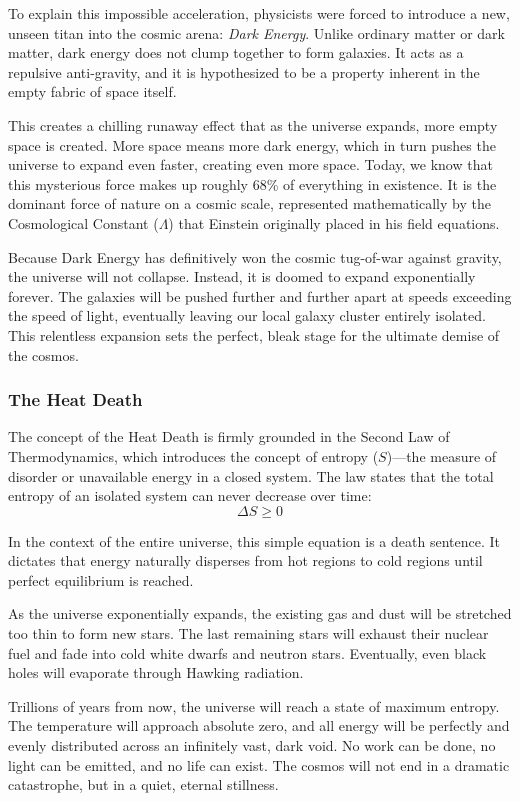 \documentclass[10pt,a4paper]{article}
\begin{document}
To explain this impossible acceleration, physicists were forced to introduce a new, unseen titan into the cosmic arena: \textit{Dark Energy}. Unlike ordinary matter or dark matter, dark energy does not clump together to form galaxies. It acts as a repulsive anti-gravity, and it is hypothesized to be a property inherent in the empty fabric of space itself. 

This creates a chilling runaway effect that as the universe expands, more empty space is created. More space means more dark energy, which in turn pushes the universe to expand even faster, creating even more space. Today, we know that this mysterious force makes up roughly 68\% of everything in existence. It is the dominant force of nature on a cosmic scale, represented mathematically by the Cosmological Constant ($\Lambda$) that Einstein originally placed in his field equations.

Because Dark Energy has definitively won the cosmic tug-of-war against gravity, the universe will not collapse. Instead, it is doomed to expand exponentially forever. The galaxies will be pushed further and further apart at speeds exceeding the speed of light, eventually leaving our local galaxy cluster entirely isolated. This relentless expansion sets the perfect, bleak stage for the ultimate demise of the cosmos.

\subsubsection{The Heat Death}
The concept of the Heat Death is firmly grounded in the Second Law of Thermodynamics, which introduces the concept of entropy ($S$)—the measure of disorder or unavailable energy in a closed system. The law states that the total entropy of an isolated system can never decrease over time:
$$\Delta S \geq 0$$

In the context of the entire universe, this simple equation is a death sentence. It dictates that energy naturally disperses from hot regions to cold regions until perfect equilibrium is reached. 

As the universe exponentially expands, the existing gas and dust will be stretched too thin to form new stars. The last remaining stars will exhaust their nuclear fuel and fade into cold white dwarfs and neutron stars. Eventually, even black holes will evaporate through Hawking radiation.

Trillions of years from now, the universe will reach a state of maximum entropy. The temperature will approach absolute zero, and all energy will be perfectly and evenly distributed across an infinitely vast, dark void. No work can be done, no light can be emitted, and no life can exist. The cosmos will not end in a dramatic catastrophe, but in a quiet, eternal stillness.
\end{document}
